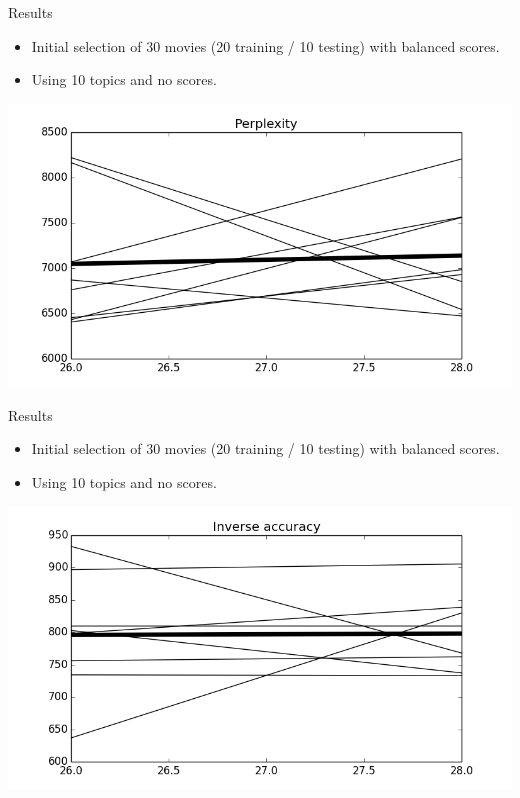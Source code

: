 \documentclass{beamer}
\begin{document}
\begin{frame}{Results}
	\begin{itemize}
	\item Initial selection of 30 movies (20 training / 10 testing) with balanced scores.
	\item Using 10 topics and no scores.
	\end{itemize}

	\begin{center}
	\includegraphics[width=\textwidth]{results_perplexity.png}
	\end{center}
\end{frame}

\begin{frame}{Results}
	\begin{itemize}
	\item Initial selection of 30 movies (20 training / 10 testing) with balanced scores.
	\item Using 10 topics and no scores.
	\end{itemize}

	\begin{center}
	\includegraphics[width=\textwidth]{results_accuracy.png}
	\end{center}
\end{frame}
\end{document}
